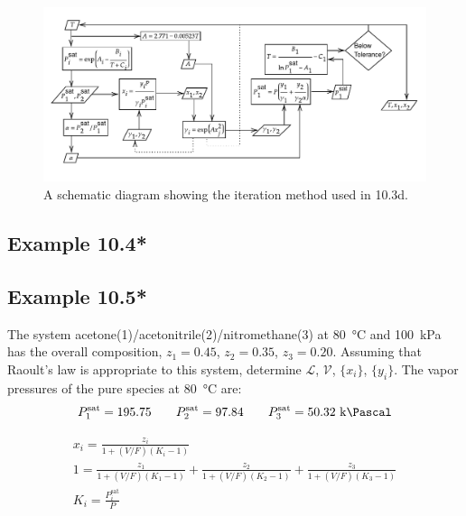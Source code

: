 \documentclass[../main.tex]{subfiles}
\begin{document}
\begin{solution}
\begin{enumerate}[label=(\alph*)]
      \begin{figure}[h!]
        \centering
        \includegraphics[width=\linewidth]{../img/e10-3d.pdf}%
        \caption{A schematic diagram showing the iteration method
        used in 10.3d.}
        \label{fig:e10-3d}
      \end{figure}

  \end{enumerate}
\end{solution}
%

%
\subsection*{Example 10.4*}

%
\subsection*{Example 10.5*}
%
The system acetone(1)/acetonitrile(2)/nitromethane(3) at
80~\unit{\degreeCelsius} and 100~\unit{\kilo\pascal} has the overall
composition, $z_{1}=0.45$, $z_{2}=0.35$, $z_{3}=0.20$. Assuming that
Raoult's law is appropriate to this system, determine $\mathcal{L}$,
$\mathcal{V}$, $\{x_{i}\}$, $\{y_{i}\}$. The vapor pressures of the
pure species at 80~\unit{\degreeCelsius} are:
%
\begin{gather*}%
  P_1^{\text{sat}} = 195.75 \qquad P_2^{\text{sat}} = 97.84 \qquad
  P_3^{\text{sat}} = 50.32~\unit{\kilo\Pascal}
\end{gather*}
%
%
\begin{solution}%
  \begin{gather*}%
    x_{i} = \frac{z_{i}}{1 + (V/F)(K_{i}-1)}\\
    1 = \frac{z_{1}}{1 + (V/F)(K_{1}-1)} + \frac{z_{2}}{1 +
    (V/F)(K_{2}-1)} + \frac{z_{3}}{1 + (V/F)(K_{3} - 1 )}\\
    K_{i} = \frac{P_{i}^{\text{sat}}}{P}\\
  \end{gather*}
\end{solution}
%
\end{document}

